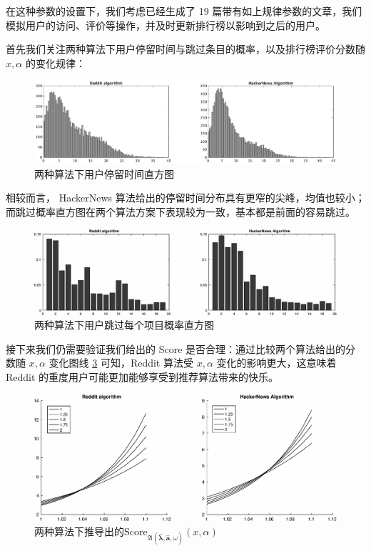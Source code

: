 \documentclass[UTF8]{ctexart}
\theoremstyle{plain}
\theoremstyle{definition}
\theoremstyle{remark}
\begin{document}
	在这种参数的设置下，我们考虑已经生成了 19 篇带有如上规律参数的文章，我们模拟用户的访问、评价等操作，并及时更新排行榜以影响到之后的用户。
	
	首先我们关注两种算法下用户停留时间与跳过条目的概率，以及排行榜评价分数随 $x, \alpha$ 的变化规律：
	
	\begin{figure}[h!]
		\centering
		\includegraphics[width = \linewidth]{../model/douhu/pic/reddit-h-time.eps}
		\caption{两种算法下用户停留时间直方图}\label{fig:reddit-h-time}
	\end{figure}
	
	相较而言， HackerNews 算法给出的停留时间分布具有更窄的尖峰，均值也较小；而跳过概率直方图在两个算法方案下表现较为一致，基本都是前面的容易跳过。
	
	\begin{figure}[h!]
		\centering
		\includegraphics[width = \linewidth]{../model/douhu/pic/reddit-h-skip.eps}
		\caption{两种算法下用户跳过每个项目概率直方图}\label{fig:reddit-h-skip}
	\end{figure}
	
	接下来我们仍需要验证我们给出的 Score 是否合理：通过比较两个算法给出的分数随 $x, \alpha$ 变化图线 \ref{fig:reddit-h-score} 可知，Reddit 算法受 $x, \alpha$ 变化的影响更大，这意味着 Reddit 的重度用户可能更加能够享受到推荐算法带来的快乐。
	
	\begin{figure}[h!]
		\centering
		\includegraphics[width = \linewidth]{../model/douhu/pic/reddit-h-score.eps}
		\caption{两种算法下推导出的$\mathrm{Score}_{\mathfrak{A}\left(\bm{\hat{\lambda}}, \bm{\hat{a}}, \omega\right)}(x, \alpha)$}\label{fig:reddit-h-score}
	\end{figure}
	
\end{document}
